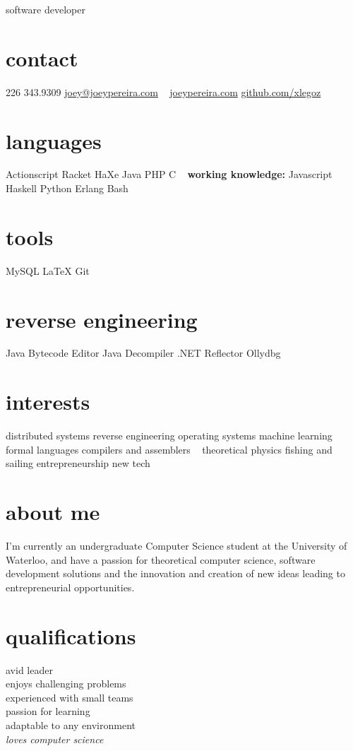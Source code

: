 \documentclass[]{friggeri-cv}
\begin{document}
       {software developer}

\begin{aside}
  \section{contact}
    226 343.9309
    \href{mailto:joey@joeypereira.com}{joey@joeypereira.com}
    ~
    \href{http://joeypereira.com}{joeypereira.com}
    \href{http://www.github.com/xlegoz}{github.com/xlegoz}
  \section{languages}
	Actionscript
	Racket
	HaXe
	Java
	PHP
	C
	~
	\textbf{working knowledge:}
	Javascript
	Haskell
	Python
	Erlang
	Bash	
  \section{tools}
    MySQL
    \LaTeX
	Git
  \section{reverse engineering}
  	Java Bytecode Editor
  	Java Decompiler
  	.NET Reflector
  	Ollydbg
  \section{interests}
  	distributed systems
  	reverse engineering
  	operating systems
  	machine learning
  	formal languages
  	compilers and assemblers
  	~
  	theoretical physics
  	fishing and sailing
  	entrepreneurship
  	new tech
\end{aside}


\section{about me}
I'm currently an undergraduate Computer Science student at the University of Waterloo, and have a passion for theoretical computer science, software development solutions and the innovation and creation of new ideas leading to entrepreneurial opportunities.
\section{qualifications}
\begin{multicols}{3}
 avid leader \\ enjoys challenging problems \\ experienced with small teams \\ passion for learning \\ adaptable to any environment \\ \em{loves} computer science
\end{multicols}
\end{document}

